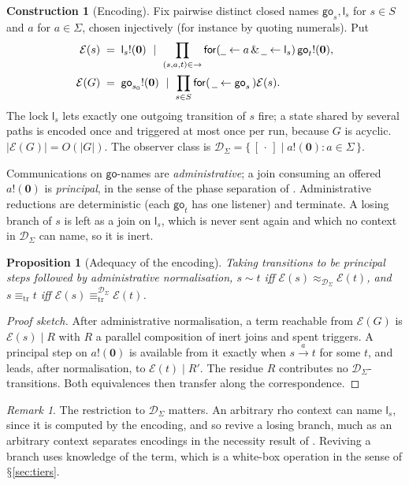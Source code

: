 \documentclass[11pt]{article}
\theoremstyle{definition}
\newtheorem{construction}[definition]{Construction}
\theoremstyle{plain}
\newtheorem{proposition}[definition]{Proposition}
\theoremstyle{remark}
\newtheorem{remark}[definition]{Remark}
\newcommand{\inp}[3]{\mathsf{for}(\,#1 \leftarrow #2\,)#3}
\newcommand{\out}[2]{#1!(#2)}
\newcommand{\nil}{\mathbf{0}}
\newcommand{\Obs}{\mathcal{D}}
\newcommand{\bisim}{\approx}
\newcommand{\sbisim}{\sim}
\newcommand{\treq}{\equiv_{\mathrm{tr}}}
\newcommand{\wild}{\mathord{\underline{\hspace{0.5em}}}}
\DeclareRobustCommand{\S}{\ifmmode\mathsection\else$\mathsection$\fi}
\newcommand{\hole}{[\,\cdot\,]}
\newcommand{\go}{\mathsf{go}}
\newcommand{\lk}{\mathsf{l}}
\newcommand{\Lab}[1]{\xrightarrow{\,#1\,}}
\begin{document}
\begin{construction}[Encoding]\label{con:encoding}
Fix pairwise distinct closed names $\go_s, \lk_s$ for $s \in S$ and $a$
for $a \in \Sigma$, chosen injectively (for instance by quoting numerals).
Put
\[
\begin{aligned}
\mathcal{E}(s) &\;=\; \out{\lk_s}{\nil}
  \ \mid\ \prod_{(s,a,t) \in \to}
     \mathsf{for}(\wild \leftarrow a \,\&\, \wild \leftarrow \lk_s)\,
     \out{\go_t}{\nil},\\
\mathcal{E}(G) &\;=\; \out{\go_{s_0}}{\nil}
  \ \mid\ \prod_{s \in S} \inp{\wild}{\go_s}{\mathcal{E}(s)}.
\end{aligned}
\]
The lock $\lk_s$ lets exactly one outgoing transition of $s$ fire; a
state shared by several paths is encoded once and triggered at most once
per run, because $G$ is acyclic. $|\mathcal{E}(G)| = O(|G|)$. The
observer class is $\Obs_\Sigma = \{\, \hole \mid \out{a}{\nil} : a \in
\Sigma \,\}$.
\end{construction}

Communications on $\go$-names are \emph{administrative}; a join
consuming an offered $\out{a}{\nil}$ is \emph{principal}, in the sense of
the phase separation of \cite{NWNS}. Administrative reductions are
deterministic (each $\go_t$ has one listener) and terminate. A losing
branch of $s$ is left as a join on $\lk_s$, which is never sent again
and which no context in $\Obs_\Sigma$ can name, so it is inert.

\begin{proposition}[Adequacy of the encoding]\label{prop:adequacy}
Taking transitions to be principal steps followed by administrative
normalisation, $s \sbisim t$ iff $\mathcal{E}(s) \bisim_{\Obs_\Sigma}
\mathcal{E}(t)$, and $s \treq t$ iff $\mathcal{E}(s)
\treq^{\Obs_\Sigma} \mathcal{E}(t)$.
\end{proposition}

\begin{proof}[Proof sketch]
After administrative normalisation, a term reachable from
$\mathcal{E}(G)$ is $\mathcal{E}(s) \mid R$ with $R$ a parallel
composition of inert joins and spent triggers. A principal step on
$\out{a}{\nil}$ is available from it exactly when $s \Lab{a} t$ for some
$t$, and leads, after normalisation, to $\mathcal{E}(t) \mid R'$. The
residue $R$ contributes no $\Obs_\Sigma$-transitions. Both equivalences
then transfer along the correspondence.
\end{proof}

\begin{remark}
The restriction to $\Obs_\Sigma$ matters. An arbitrary rho context can
name $\lk_s$, since it is computed by the encoding, and so revive a
losing branch, much as an arbitrary context separates encodings in the
necessity result of \cite{NWNS}. Reviving a branch uses knowledge of the
term, which is a white-box operation in the sense of \S\ref{sec:tiers}.
\end{remark}
\end{document}
